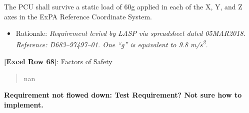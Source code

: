 The PCU shall survive a static load of 60g applied in each of the X, Y, and Z axes in the ExPA Reference Coordinate System.

\begin{itemize}
\item{} Rationale: \emph{Requirement levied by LASP via spreadsheet dated 05MAR2018. Reference: D683--97497--01. One ``g'' is equivalent to 9.8 m\slash s\textsuperscript{2}.}

\end{itemize}

\textbf{[Excel Row 68]}: Factors of Safety

\begin{quote}
nan
\end{quote}

\textbf{Requirement not flowed down: Test Requirement? Not sure how to implement.}




